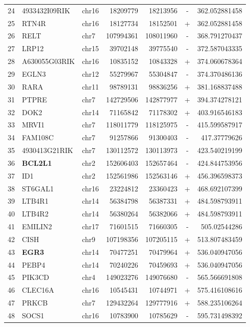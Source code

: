 \begin{table}
\begin{tabular}{rllrrcr}
24 & 4933432I09RIK & chr16 & 18209779 & 18213956 & - & 362.052881458 \\
25 & RTN4R & chr16 & 18127734 & 18152501 & + & 362.052881458 \\
26 & RELT & chr7 & 107994361 & 108011960 & - & 368.791270437 \\
27 & LRP12 & chr15 & 39702148 & 39775540 & - & 372.587043335 \\
28 & A630055G03RIK & chr16 & 10835152 & 10843328 & + & 374.060678364 \\
29 & EGLN3 & chr12 & 55279967 & 55304847 & - & 374.370486136 \\
30 & RARA & chr11 & 98789131 & 98836256 & + & 381.168837488 \\
31 & PTPRE & chr7 & 142729506 & 142877977 & + & 394.374278121 \\
32 & DOK2 & chr14 & 71165842 & 71178302 & + & 403.916546183 \\
33 & MRVI1 & chr7 & 118011779 & 118125975 & - & 415.599587917 \\
34 & FAM108C & chr7 & 91257866 & 91300403 & - & 417.37779626 \\
35 & 4930413G21RIK & chr7 & 130112572 & 130113973 & - & 423.540219199 \\
36 & \textbf{BCL2L1} & chr2 & 152606403 & 152657464 & - & 424.844753956 \\
37 & ID1 & chr2 & 152561986 & 152563146 & + & 456.396598373 \\
38 & ST6GAL1 & chr16 & 23224812 & 23360423 & + & 468.692107399 \\
39 & LTB4R1 & chr14 & 56384798 & 56387331 & + & 484.598793911 \\
40 & LTB4R2 & chr14 & 56380264 & 56382066 & + & 484.598793911 \\
41 & EMILIN2 & chr17 & 71601515 & 71660305 & - & 505.02544286 \\
42 & CISH & chr9 & 107198356 & 107205115 & + & 513.807483459 \\
43 & \textbf{EGR3} & chr14 & 70477251 & 70479964 & + & 536.040947056 \\
44 & PEBP4 & chr14 & 70240226 & 70459693 & + & 536.040947056 \\
45 & PIK3CD & chr4 & 149023276 & 149076680 & - & 565.566691808 \\
46 & CLEC16A & chr16 & 10545431 & 10744971 & + & 575.416108616 \\
47 & PRKCB & chr7 & 129432264 & 129777916 & + & 588.235106264 \\
48 & SOCS1 & chr16 & 10783900 & 10785629 & - & 595.731498392 \\

\end{tabular}
\end{table}
